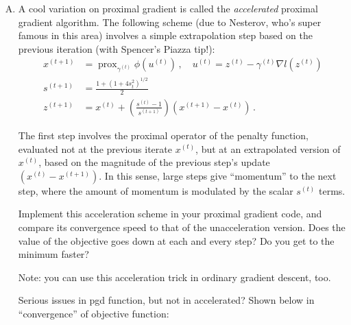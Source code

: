 \documentclass{article}
\newcommand{\prox}{ \mathop{\mathrm{prox}} }
\begin{document}
\begin{enumerate}[(A)]
\item A cool variation on proximal gradient is called the \textit{accelerated} proximal gradient algorithm.   The following scheme (due to Nesterov, who's super famous in this area) involves a simple extrapolation step based on the previous iteration (with Spencer's Piazza tip!):
$$
\begin{aligned}
x^{(t+1)} &= \prox_{ \gamma^{(t)}} \phi(u^{(t)}) \, , \quad u^{(t)} =  z^{(t)} - \gamma^{(t)} \nabla l(z^{(t)})  \\
s^{(t+1)} &= \frac{1 + (1 + 4 s_{t}^2)^{1/2}}{2} \\
z^{(t+1)} &=  x^{(t)} + \left( \frac{s^{(t)} - 1}{s^{(t+1)}} \right) (x^{(t+1)} - x^{(t)}) \, .
\end{aligned}
$$



The first step involves the proximal operator of the penalty function, evaluated not at the previous iterate $x^{(t)}$, but at an extrapolated version of $x^{(t)}$, based on the magnitude of the previous step's update $(x^{(t)} - x^{(t+1)})$.  In this sense, large steps give ``momentum'' to the next step, where the amount of momentum is modulated by the scalar $s^{(t)}$ terms.

Implement this acceleration scheme in your proximal gradient code, and compare its convergence speed to that of the unacceleration version.  Does the value of the objective goes down at each and every step?  Do you get to the minimum faster?

Note: you can use this acceleration trick in ordinary gradient descent, too.


\color{blue}
Serious issues in pgd function, but not in accelerated? Shown below in ``convergence'' of objective function:

\begin{center}
\end{center}

\color{black}


\end{enumerate}
\end{document}
